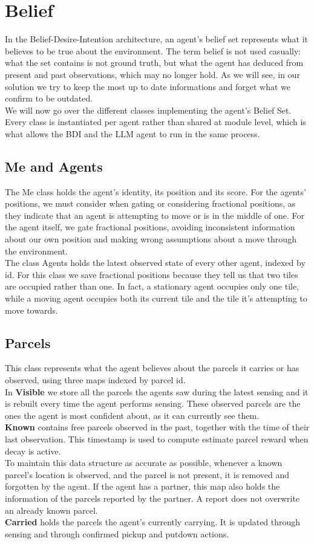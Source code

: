 \documentclass[11pt,a4paper]{article}
\begin{document}
\section{Belief}
In the Belief-Desire-Intention architecture, an agent's belief set represents what it believes to be true about the environment. 
The term belief is not used casually: what the set contains is not ground truth, but what the agent has deduced from present and past observations, which may no longer hold.
As we will see, in our solution we try to keep the most up to date informations and forget what we confirm to be outdated.
\\We will now go over the different classes implementing the agent's Belief Set.
Every class is instantiated per agent rather than shared at module level, which is what allows the BDI and the LLM agent to run in the same process.

\subsection{Me and Agents}
The Me class holds the agent's identity, its position and its score.
For the agents' positions, we must consider when gating or considering fractional positions, as they indicate that an agent is attempting to move or is in the middle of one. 
For the agent itself, we gate fractional positions, avoiding inconsistent information about our own position and making wrong assumptions about a move through the environment.
\\The class Agents holds the latest observed state of every other agent, indexed by id.
For this class we save fractional positions because they tell us that two tiles are occupied rather than one.
In fact, a stationary agent occupies only one tile, while a moving agent occupies both its current tile and the tile it's attempting to move towards.

\subsection{Parcels}
This class represents what the agent believes about the parcels it carries or has observed, using three maps indexed by parcel id.
\\In \textbf{Visible} we store all the parcels the agents saw during the latest sensing and it is rebuilt every time the agent performs sensing.
These observed parcels are the ones the agent is most confident about, as it can currently see them.
\\\textbf{Known} contains free parcels observed in the past, together with the time of their last observation.
This timestamp is used to compute estimate parcel reward when decay is active.
\\To maintain this data structure as accurate as possible, whenever a known parcel's location is observed, and the parcel is not present, it is removed and forgotten by the agent.
If the agent has a partner, this map also holds the information of the parcels reported by the partner. A report does not overwrite an already known parcel.
\\\textbf{Carried} holds the parcels the agent's currently carrying. 
It is updated through sensing and through confirmed pickup and putdown actions.
\end{document}

